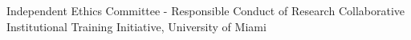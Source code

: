 %
%
%

\begin{scholarship}
				{Independent Ethics Committee - Responsible Conduct of Research}
				{Collaborative Institutional Training Initiative, University of Miami}
\end{scholarship}
